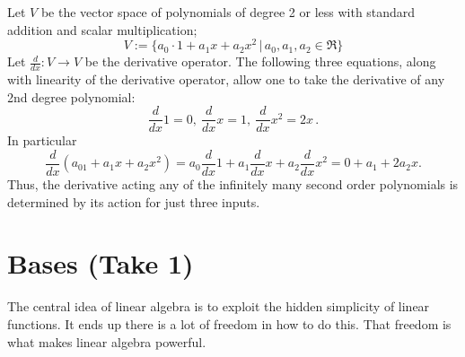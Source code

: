 \begin{example}
Let $V$ be the vector space of polynomials of degree 2 or less with standard addition and scalar multiplication;
\[
V := \{a_0\cdot1 + a_1x + a_2 x^2 \, | \,  a_0,a_1,a_2 \in \Re \}
\]
Let $\frac{d}{dx} \colon V\rightarrow V$ be \hypertarget{derivative_linear}{the derivative operator.}  
The following three equations, along with linearity of the derivative operator, allow one to take the derivative of any 2nd degree polynomial:
\[
\frac{d}{dx} 1=0,~\frac{d}{dx}x=1,~\frac{d}{dx}x^2=2x\,. 
\]
In particular
\[
\frac{d}{dx} (a_01 + a_1x + a_2 x^2) = 
 a_0\frac{d}{dx}1 + a_1 \frac{d}{dx} x + a_2 \frac{d}{dx} x^2  
 = 0+a_1+2a_2x.
\]
Thus, the derivative acting any of the infinitely many second order polynomials is determined by its action for just three inputs.

%
\end{example}


\section{Bases (Take 1)} 
The central idea of linear algebra is to exploit the hidden simplicity of linear functions. 
It ends up there is a lot of freedom in how to do this. That freedom is what makes linear algebra powerful.


